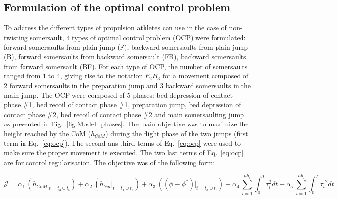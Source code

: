 

\subsection{Formulation of the optimal control problem}\label{subsec:2e}
To address the different types of propulsion athletes can use in the case of non-twisting somersault, 4 types of optimal control problem (OCP) were formulated: forward somersaults from plain jump (F), backward somersaults from plain jump (B), forward somersaults from backward somersault (FB), backward somersaults from forward somersault (BF).
For each type of OCP, the number of somersaults ranged from 1 to 4, giving rise to the notation $F_2B_3$ for a movement composed of 2 forward somersaults in the preparation jump and 3 backward somersaults in the main jump.
The OCP were composed of 5 phases: bed depression of contact phase \#1, bed recoil of contact phase \#1, preparation jump, bed depression of contact phase \#2, bed recoil of contact phase \#2 and main somersaulting jump as presented in Fig.~\ref{fig:Model_phases}.
The main objective was to maximize the height reached by the CoM ($h_{CoM}$) during the flight phase of the two jumps (first term in Eq.~\ref{eq:ocp}).
The second ans third terms of Eq.~\ref{eq:ocp} were used to make sure the proper movement is executed.
The two last terms of Eq.~\ref{eq:ocp} are for control regularisation.
The objective was of the following form:

\[
\mathcal{J} = \alpha_1~(h_{CoM} \big\rvert_{t = t_3 \cup t_6}) + \alpha_2~(h_{bed} \big\rvert_{t = t_1 \cup t_4}) + \alpha_3~((\phi - \phi^*) \big\rvert_{t = t_3 \cup t_6}) + \alpha_4~\sum_{i=1}^{nb_{\tau}} \int_0^T \tau_{i}^2 dt + \alpha_5~\sum_{i=1}^{nb_{\tau}}  \int_0^T \dot{\tau_{i}}^2 dt \label{eq:ocp}
\]

